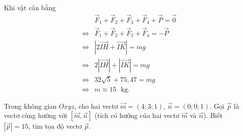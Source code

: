 \begin{bt}
{		Khi vật cân bằng 
		\begin{eqnarray*}
			&&\overrightarrow{F}_1+\overrightarrow{F}_2+\overrightarrow{F}_3+\overrightarrow{F}_4+\overrightarrow{P} = \overrightarrow{0}\\ 
			&\Leftrightarrow& \overrightarrow{F}_1+\overrightarrow{F}_2+\overrightarrow{F}_3+\overrightarrow{F}_4 =  - \overrightarrow{P}\\
			&\Leftrightarrow& \left|2\overrightarrow{IH}+\overrightarrow{IK}\right|  =mg\\
			&\Leftrightarrow& 2\left|\overrightarrow{IH}\right|+\left|\overrightarrow{IK}\right| =  mg\\
			&\Leftrightarrow& 32\sqrt{5}+75{,}47  = mg\\
			&\Leftrightarrow& m \approx 15 \text{  ~kg}.
		\end{eqnarray*}
	} 
\end{bt}



\begin{bt}%
	Trong không gian $Oxyz$, cho hai vectơ $\overrightarrow{m}=(4;3;1)$, $\overrightarrow{n}=(0;0;1)$. Gọi $\overrightarrow{p}$ là vectơ cùng  hướng với $\left[\overrightarrow{m}, \overrightarrow{n}\right]$ (tích có hướng của hai vectơ $\overrightarrow{m}$ và $\overrightarrow{n}$). Biết $\left|\overrightarrow{p}\right| =15$, tìm tọa độ vectơ $\overrightarrow{p}$.
\end{bt}

